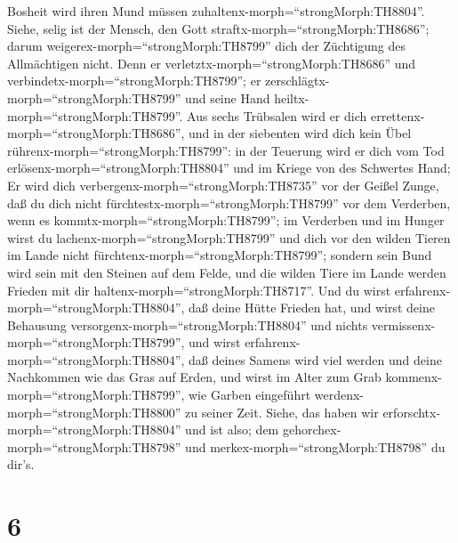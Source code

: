 Bosheit wird ihren Mund müssen zuhaltenx-morph=``strongMorph:TH8804''.
 Siehe, selig ist der Mensch, den Gott
straftx-morph=``strongMorph:TH8686''; darum
weigerex-morph=``strongMorph:TH8799'' dich der Züchtigung des
Allmächtigen nicht.  Denn er
verletztx-morph=``strongMorph:TH8686'' und
verbindetx-morph=``strongMorph:TH8799''; er
zerschlägtx-morph=``strongMorph:TH8799'' und seine Hand
heiltx-morph=``strongMorph:TH8799''.  Aus sechs Trübsalen
wird er dich errettenx-morph=``strongMorph:TH8686'', und in der
siebenten wird dich kein Übel rührenx-morph=``strongMorph:TH8799'':
 in der Teuerung wird er dich vom Tod
erlösenx-morph=``strongMorph:TH8804'' und im Kriege von des Schwertes
Hand;  Er wird dich verbergenx-morph=``strongMorph:TH8735''
vor der Geißel Zunge, daß du dich nicht
fürchtestx-morph=``strongMorph:TH8799'' vor dem Verderben, wenn es
kommtx-morph=``strongMorph:TH8799'';  im Verderben und im
Hunger wirst du lachenx-morph=``strongMorph:TH8799'' und dich vor den
wilden Tieren im Lande nicht fürchtenx-morph=``strongMorph:TH8799'';
 sondern sein Bund wird sein mit den Steinen auf dem Felde,
und die wilden Tiere im Lande werden Frieden mit dir
haltenx-morph=``strongMorph:TH8717''.  Und du wirst
erfahrenx-morph=``strongMorph:TH8804'', daß deine Hütte Frieden hat, und
wirst deine Behausung versorgenx-morph=``strongMorph:TH8804'' und nichts
vermissenx-morph=``strongMorph:TH8799'',  und wirst
erfahrenx-morph=``strongMorph:TH8804'', daß deines Samens wird viel
werden und deine Nachkommen wie das Gras auf Erden,  und
wirst im Alter zum Grab kommenx-morph=``strongMorph:TH8799'', wie Garben
eingeführt werdenx-morph=``strongMorph:TH8800'' zu seiner Zeit.
 Siehe, das haben wir
erforschtx-morph=``strongMorph:TH8804'' und ist also; dem
gehorchex-morph=``strongMorph:TH8798'' und
merkex-morph=``strongMorph:TH8798'' du dir's.

\hypertarget{section-5}{%
\section{6}\label{section-5}}

